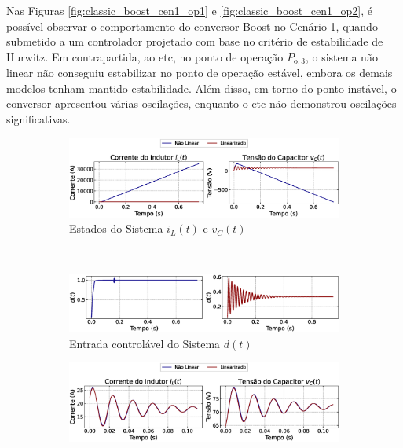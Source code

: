 Nas Figuras \ref{fig:classic_boost_cen1_op1} e \ref{fig:classic_boost_cen1_op2}, é possível observar o comportamento do conversor Boost no Cenário 1, quando submetido a um controlador projetado com base no critério de estabilidade de Hurwitz. Em contrapartida, ao \acrshort{etc}, no ponto de operação $P_{\mathrm{o}, 3}$, o sistema não linear não conseguiu estabilizar no ponto de operação estável, embora os demais modelos tenham mantido estabilidade. Além disso, em torno do ponto instável, o conversor apresentou várias oscilações, enquanto o \acrshort{etc} não demonstrou oscilações significativas.

\begin{figure}[H]
  \centering
  \captionsetup{justification=centering}
  \begin{subfigure}{1.\textwidth}
    \centering
    \includegraphics[width=1.\textwidth]{figuras/classic/boost/sim1/op1/result.eps}
    \caption{Estados do Sistema $i_L(t)$  e $v_C(t)$}
  \end{subfigure}
  \\[6pt]
  \begin{subfigure}{1.\textwidth}
    \centering
    \includegraphics[width=1.\textwidth]{figuras/classic/boost/sim1/op1/duty-cycle.eps}
    \caption{Entrada controlável do Sistema $d(t)$}
  \end{subfigure}
  \caption{Conversor Boost no Cenário 1 operando em torno de $P_{\mathrm{o}, 3}$ sob controlador projetado utilizando o critério de estabilidade de Hurwitz.}
  \label{fig:classic_boost_cen1_op1}
  \begin{subfigure}{1.\textwidth}
    \centering
    \includegraphics[width=1.\textwidth]{figuras/classic/boost/sim1/op2/result.eps}

\end{subfigure}
\end{figure}
